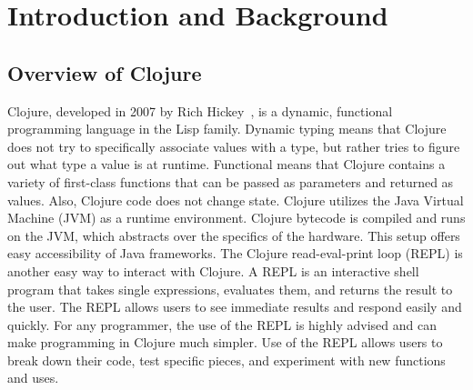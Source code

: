 \documentclass[12pt]{article}
\newcommand{\comment}[1]{{\bf \tt  {#1}}}
\newcommand{\emcomment}[1]{\textcolor{ForestGreen}{\comment{Elena: {#1}}}}
\newcommand{\hfcomment}[1]{\textcolor{Teal}{\comment{Henry: {#1}}}}
\begin{document}
\section{Introduction and Background}\label{sec:intro}
\subsection{Overview of Clojure}\label{sec:clojure}
  
  
Clojure, developed in 2007 by Rich Hickey~\cite{Hickey:2008}, is a dynamic, functional
programming language in the Lisp family. Dynamic typing means that Clojure does not try to specifically
associate
values with a type, but rather tries to figure out what type a value is at runtime. Functional means
that Clojure contains a variety of first-class functions that can be passed as parameters and returned
as values. Also, Clojure code does not change state.
Clojure utilizes the Java Virtual Machine (JVM) as a runtime environment. Clojure bytecode is compiled
and runs on the JVM, which abstracts over the specifics of the hardware.
This setup offers easy 
accessibility of Java frameworks. The Clojure read-eval-print loop (REPL)
is another easy way to interact 
 with Clojure. A REPL is an interactive shell program that takes single 
expressions, evaluates them, and returns the result to the user. The REPL allows users to see 
immediate results and respond easily and quickly. For any programmer, the use of the REPL 
is highly advised and can make programming in Clojure much simpler. Use of the REPL allows users
to break down their code, test specific pieces, and experiment with new functions and uses.
\end{document}
